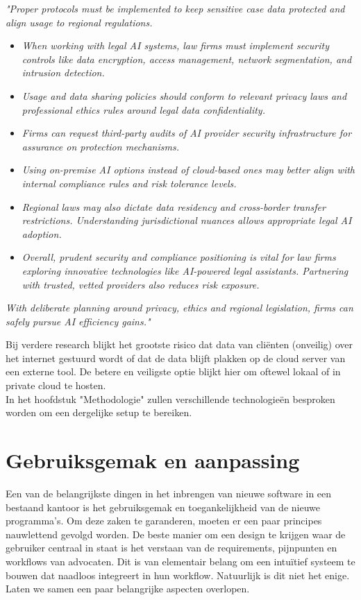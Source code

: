 \begin{displayquote}
	\textit{"Proper protocols must be implemented to keep sensitive case data protected and align usage to regional regulations.}
	\begin{itemize}
		\item \emph{ When working with legal AI systems, law firms must implement security controls like data encryption, access management, network segmentation, and intrusion detection.}
		\item \emph{ Usage and data sharing policies should conform to relevant privacy laws and professional ethics rules around legal data confidentiality.}
		\item \emph{ Firms can request third-party audits of AI provider security infrastructure for assurance on protection mechanisms.}
		\item \emph{ Using on-premise AI options instead of cloud-based ones may better align with internal compliance rules and risk tolerance levels.}
		\item \emph{ Regional laws may also dictate data residency and cross-border transfer restrictions. Understanding jurisdictional nuances allows appropriate legal AI adoption.}
		\item \emph{ Overall, prudent security and compliance positioning is vital for law firms exploring innovative technologies like AI-powered legal assistants. Partnering with trusted, vetted providers also reduces risk exposure.}
	\end{itemize}

	\textit{With deliberate planning around privacy, ethics and regional legislation, firms can safely pursue AI efficiency gains."}\autocite{LegalBuddies}
\end{displayquote}

Bij verdere research blijkt het grootste risico dat data van cliënten (onveilig) over het internet gestuurd wordt of dat de data blijft plakken op de cloud server van een externe tool.
De betere en veiligste optie blijkt hier om oftewel lokaal of in private cloud te hosten.
\\In het hoofdstuk "Methodologie" zullen verschillende technologieën besproken worden om een dergelijke setup te bereiken.

\section{Gebruiksgemak en aanpassing}
Een van de belangrijkste dingen in het inbrengen van nieuwe software in een bestaand kantoor is het gebruiksgemak en toegankelijkheid van de nieuwe programma's.
Om deze zaken te garanderen, moeten er een paar principes nauwlettend gevolgd worden.
De beste manier om een design te krijgen waar de gebruiker centraal in staat is het verstaan van de requirements, pijnpunten en workflows van advocaten.
Dit is van elementair belang om een intuïtief systeem te bouwen dat naadloos integreert in hun workflow. Natuurlijk is dit niet het enige.
Laten we samen een paar belangrijke aspecten overlopen.

